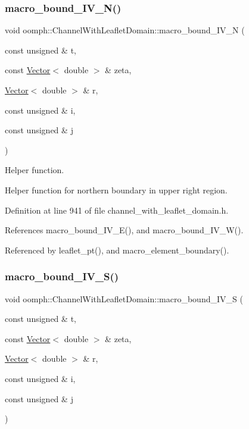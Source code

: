 \subsubsection{\texorpdfstring{macro\+\_\+bound\+\_\+\+I\+V\+\_\+\+N()}{macro\_bound\_IV\_N()}}
{\footnotesize\ttfamily void oomph\+::\+Channel\+With\+Leaflet\+Domain\+::macro\+\_\+bound\+\_\+\+I\+V\+\_\+N (\begin{DoxyParamCaption}\item[{const unsigned \&}]{t,  }\item[{const \hyperlink{classoomph_1_1Vector}{Vector}$<$ double $>$ \&}]{zeta,  }\item[{\hyperlink{classoomph_1_1Vector}{Vector}$<$ double $>$ \&}]{r,  }\item[{const unsigned \&}]{i,  }\item[{const unsigned \&}]{j }\end{DoxyParamCaption})\hspace{0.3cm}{\ttfamily [protected]}}



Helper function. 

Helper function for northern boundary in upper right region. 

Definition at line 941 of file channel\+\_\+with\+\_\+leaflet\+\_\+domain.\+h.



References macro\+\_\+bound\+\_\+\+I\+V\+\_\+\+E(), and macro\+\_\+bound\+\_\+\+I\+V\+\_\+\+W().



Referenced by leaflet\+\_\+pt(), and macro\+\_\+element\+\_\+boundary().

\mbox{\label{classoomph_1_1ChannelWithLeafletDomain_a038eba8447f4d1643cd44642294bf43f}} 
\subsubsection{\texorpdfstring{macro\+\_\+bound\+\_\+\+I\+V\+\_\+\+S()}{macro\_bound\_IV\_S()}}
{\footnotesize\ttfamily void oomph\+::\+Channel\+With\+Leaflet\+Domain\+::macro\+\_\+bound\+\_\+\+I\+V\+\_\+S (\begin{DoxyParamCaption}\item[{const unsigned \&}]{t,  }\item[{const \hyperlink{classoomph_1_1Vector}{Vector}$<$ double $>$ \&}]{zeta,  }\item[{\hyperlink{classoomph_1_1Vector}{Vector}$<$ double $>$ \&}]{r,  }\item[{const unsigned \&}]{i,  }\item[{const unsigned \&}]{j }\end{DoxyParamCaption})\hspace{0.3cm}{\ttfamily [protected]}}



